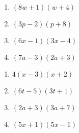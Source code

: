 \begin{multicols}{4}
\begin{enumerate}	\setcounter{enumi}{\value{Review}}
\item $(8w+1)(w+4)$
\item $(3p-2)(p+8)$
\item $(6x-1)(3x-4)$
\item $(7a-3)(2a+3)$
\end{enumerate}	\setcounter{Review}{\value{enumi}}
\end{multicols}
\begin{multicols}{4}
\begin{enumerate}	\setcounter{enumi}{\value{Review}}
\item $4(x-3)(x+2)$
\item $(6t-5)(3t+1)$
\item $(2a+3)(3a+7)$
\item $(5x+1)(5x-1)$
\end{enumerate}
\end{multicols}